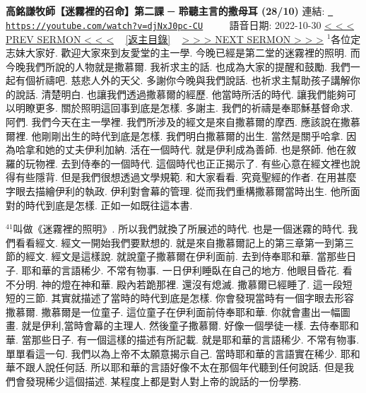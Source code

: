 \documentclass{book}
\begin{document}
\section{}
\label{sec:djNxJ0pc_CU}
\textbf{高銘謙牧師【迷霧裡的召命】第二課 ─ 聆聽主言的撒母耳 (28/10)}
\newline
\newline
連結: \href{https://youtube.com/watch?v=djNxJ0pc-CU}{\texttt{ https://youtube.com/watch?v=djNxJ0pc-CU}} ~~~~ 語音日期: 2022-10-30 
\newline
\newline
\hyperref[sec:H4gdcVXwfVM]{\small{< < < PREV SERMON < < <}}
~
\hyperref[sec:index]{\small{[返主目錄]}}
~
\hyperref[sec:FHx_k0UyGMs]{\small{> > > NEXT SERMON > > >}}
\newline
\newline
$^{1}$各位定志妹大家好.
歡迎大家來到友愛堂的主一學.
今晚已經是第二堂的迷霧裡的照明.
而今晚我們所說的人物就是撒慕爾.
我祈求主的話.
也成為大家的提醒和鼓勵.
我們一起有個祈禱吧.
慈悲人外的天父.
多謝你今晚與我們說話.
也祈求主幫助孩子講解你的說話.
清楚明白.
也讓我們透過撒慕爾的經歷.
他當時所活的時代.
讓我們能夠可以明瞭更多.
關於照明這回事到底是怎樣.
多謝主.
我們的祈禱是奉耶穌基督命求.
阿們.
我們今天在主一學裡.
我們所涉及的經文是來自撒慕爾的摩西.
應該說在撒慕爾裡.
他剛剛出生的時代到底是怎樣.
我們明白撒慕爾的出生.
當然是關乎哈拿.
因為哈拿和她的丈夫伊利加納.
活在一個時代.
就是伊利成為善師.
也是祭師.
他在敘羅的玩物裡.
去到侍奉的一個時代.
這個時代也正正揭示了.
有些心意在經文裡也說得有些隱背.
但是我們很想透過文學規範.
和大家看看.
究竟聖經的作者.
在用甚麼字眼去描繪伊利的執政.
伊利對會幕的管理.
從而我們重構撒慕爾當時出生.
他所面對的時代到底是怎樣.
正如一如既往這本書.

$^{41}$叫做《迷霧裡的照明》.
所以我們就換了所展述的時代.
也是一個迷霧的時代.
我們看看經文.
經文一開始我們要默想的.
就是來自撒慕爾記上的第三章第一到第三節的經文.
經文是這樣說.
就說童子撒慕爾在伊利面前.
去到侍奉耶和華.
當那些日子.
耶和華的言語稀少.
不常有物事.
一日伊利睡臥在自己的地方.
他眼目昏花.
看不分明.
神的燈在神和華.
殿內若跪那裡.
還沒有熄滅.
撒慕爾已經睡了.
這一段短短的三節.
其實就描述了當時的時代到底是怎樣.
你會發現當時有一個字眼去形容撒慕爾.
撒慕爾是一位童子.
這位童子在伊利面前侍奉耶和華.
你就會畫出一幅圖畫.
就是伊利,當時會幕的主理人.
然後童子撒慕爾.
好像一個學徒一樣.
去侍奉耶和華.
當那些日子.
有一個這樣的描述有所記載.
就是耶和華的言語稀少.
不常有物事.
單單看這一句.
我們以為上帝不太願意揭示自己.
當時耶和華的言語實在稀少.
耶和華不跟人說任何話.
所以耶和華的言語好像不太在那個年代聽到任何說話.
但是我們會發現稀少這個描述.
某程度上都是對人對上帝的說話的一份學務.
\end{document}
